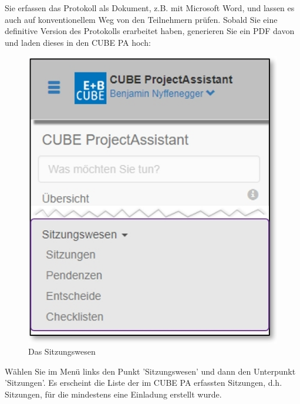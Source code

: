 Sie erfassen das Protokoll als Dokument, z.B. mit Microsoft Word, und lassen es auch auf konventionellem Weg von den Teilnehmern prüfen. Sobald Sie eine definitive Version des Protokolls erarbeitet haben, generieren Sie ein PDF davon und laden dieses in den CUBE PA hoch:

\vspace{\baselineskip}

\begin{figure}   %
  \vspace{-35pt}      %
  \begin{center}
    \includegraphics[width=1\linewidth]{../chapters/05_Sitzungswesen/pictures/5-1_Menu_Sitzungswesen.jpg}
  \end{center}
  \vspace{-20pt}
  \caption{Das Sitzungswesen}
  \vspace{-10pt}
\end{figure}

Wählen Sie im Menü links den Punkt 'Sitzungswesen' und dann den Unterpunkt 'Sitzungen'. Es erscheint die Liste der im CUBE PA erfassten Sitzungen, d.h. Sitzungen, für die mindestens eine Einladung erstellt wurde. \newline


